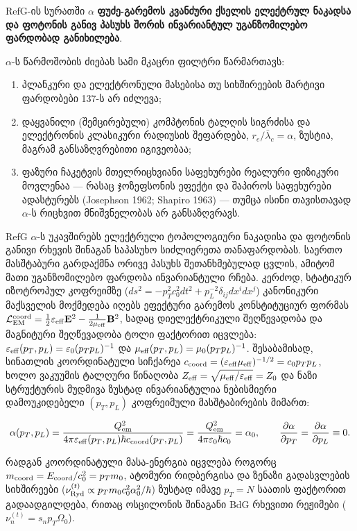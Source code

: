 \documentclass[11pt,a4paper]{article}
\begin{document}
RefG-ის სურათში $\alpha$ \textbf{ფუძე-გარემოს კვანძური ქსელის ელექტრულ ნაკადსა და ფოტონის განივ პასუხს შორის ინვარიანტულ უგანზომილებო ფარდობად განიხილება}.

$\alpha$-ს წარმოშობის ძიებას სამი მკაცრი ფილტრი წარმართავს:

\begin{enumerate}[label=\arabic*.]
\item პლანკური და ელექტრონული მასებისა თუ სიხშირეების მარტივი ფარდობები 137-ს არ იძლევა;
\item დაყვანილი (შემცირებული) კომპტონის ტალღის სიგრძისა და ელექტრონის კლასიკური რადიუსის შეფარდება, $r_e/\bar{\lambda}_c=\alpha$, ზუსტია, მაგრამ განსაზღვრებითი იგივეობაა;
\item ფაზური ჩაკეტვის მთელრიცხვიანი საფეხურები რეალური ფიზიკური მოვლენაა — რასაც ჯოზეფსონის ეფექტი და შაპიროს საფეხურები ადასტურებს (Josephson 1962; Shapiro 1963) — თუმცა ისინი თავისთავად $\alpha$-ს რიცხვით მნიშვნელობას არ განსაზღვრავს.

\end{enumerate}
RefG $\alpha$-ს უკავშირებს ელექტრული ტოპოლოგიური ნაკადისა და ფოტონის განივი რხევის შინაგან საპასუხო სიძლიერეთა თანაფარდობას. საერთო მასშტაბური გარდაქმნა ორივე პასუხს შეთანხმებულად ცვლის, ამიტომ მათი უგანზომილებო ფარდობა ინვარიანტული რჩება. კერძოდ, სტატიკურ იზოტროპულ კოფრეიმზე ($ds^2 = -p_T^2 c_0^2 dt^2 + p_L^{-2}\delta_{ij}dx^i dx^j$) კანონიკური მაქსველის მოქმედება იღებს ეფექტური გარემოს კონსტიტუციურ ფორმას $\mathcal{L}_{\rm EM}^{\rm coord} = \frac{1}{2}\varepsilon_{\rm eff}\mathbf{E}^2 - \frac{1}{2\mu_{\rm eff}}\mathbf{B}^2$, სადაც დიელექტრიკული შეღწევადობა და მაგნიტური შეღწევადობა ტოლი ფაქტორით იცვლება: $\varepsilon_{\rm eff}(p_T, p_L) = \varepsilon_0(p_T p_L)^{-1}$ და $\mu_{\rm eff}(p_T, p_L) = \mu_0(p_T p_L)^{-1}$. შესაბამისად, სინათლის კოორდინატული სიჩქარეა $c_{\rm coord} = (\varepsilon_{\rm eff}\mu_{\rm eff})^{-1/2} = c_0 p_T p_L$, ხოლო ვაკუუმის ტალღური წინაღობა $Z_{\rm eff} = \sqrt{\mu_{\rm eff}/\varepsilon_{\rm eff}} = Z_0$ და ნაზი სტრუქტურის მუდმივა ზუსტად ინვარიანტულია ნებისმიერი დამოუკიდებელი $(p_T, p_L)$ კოფრეიმული მასშტაბირების მიმართ:

\[
\alpha(p_T, p_L) = \frac{Q_{\rm em}^2}{4\pi\varepsilon_{\rm eff}(p_T, p_L)\hbar c_{\rm coord}(p_T, p_L)} = \frac{Q_{\rm em}^2}{4\pi\varepsilon_0\hbar c_0} = \alpha_0, \qquad \frac{\partial\alpha}{\partial p_T} = \frac{\partial\alpha}{\partial p_L} \equiv 0.
\]

რადგან კოორდინატული მასა-ენერგია იცვლება როგორც $m_{\rm coord} = E_{\rm coord}/c_0^2 = p_T m_0$, ატომური რიდბერგისა და ზენაზი გადასვლების სიხშირეები ($\nu_{\rm Ryd}^{(t)} \propto p_T m_0 c_0^2 \alpha_0^2/\hbar$) ზუსტად იმავე $p_T = N$ საათის ფაქტორით გადაადგილდება, რითაც ოსცილონის შინაგანი BdG რხევითი რეჟიმები ($\nu_n^{(t)} = s_n p_T\Omega_0$).
\end{document}
